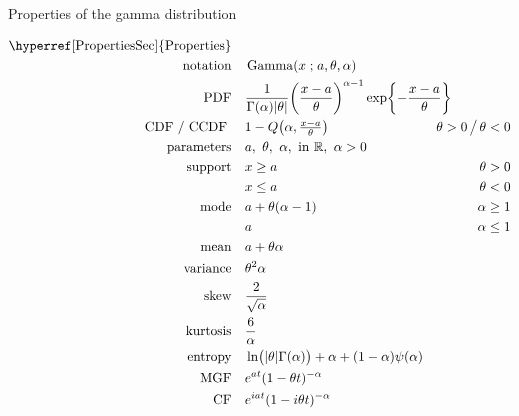 

\begin{table*}[tp!]

\caption[Gamma distribution -- Properties]{Properties of the gamma distribution}

\begin{align*}
\text{\hyperref[PropertiesSec]{Properties}}  \quad& \\
\text{notation} \quad &  \op{Gamma}(x\given a, \theta, \alpha) 	\checked
\\
\text{PDF} \quad &
\frac{1}{\Gamma(\alpha)\Left|\theta\Right|} 
\Left(\frac{x-a}{\theta}\Right)^{\alpha  -1}
\exp \Left\{
-  \frac{x-a}{\theta}
\Right\}
\checked \hspace{-8em}						
\\ 
\text{CDF / CCDF } \quad  &    1-Q\Left(\alpha, \tfrac{x - a }{\theta} \Right) \checked
& \theta>0 \, \big/ \,  \theta<0
\\
\text{parameters}\quad &   a,\ \theta,\ \alpha,\  \text{in } \Real, \ \alpha>0
\\
\text{support} \quad &     x \geq a &  \theta > 0
\\
&   x\leq a  &  \theta < 0 
\\
\text{mode} \quad&   a+ \theta (\alpha-1)
& \alpha   \geq 1 \checked
\\ & a & \alpha   \le 1 \checked
\\
\text{mean} \quad& a  + \theta \alpha \checked
\\
\text{variance}  \quad&   \theta^2 \alpha \checked & 
\\
\text{skew} \quad  &  \frac{2}{\sqrt{\alpha}}  \checked
\\
\text{kurtosis} \quad  &  \frac{6}{\alpha} \checked
\\
\text{entropy} \quad& 
\ln \bigl(|\theta| \Gamma(\alpha) \bigr)+\alpha + \Left( 1 - \alpha\Right) \psi(\alpha) \checked
\\
\text{MGF} \quad  &   e^{a t} (1- \theta t)^{-\alpha}	\checked
\\
\text{CF} \quad  &  e^{i a t} (1- i \theta t)^{-\alpha}		\checked
\end{align*}
\end{table*}


